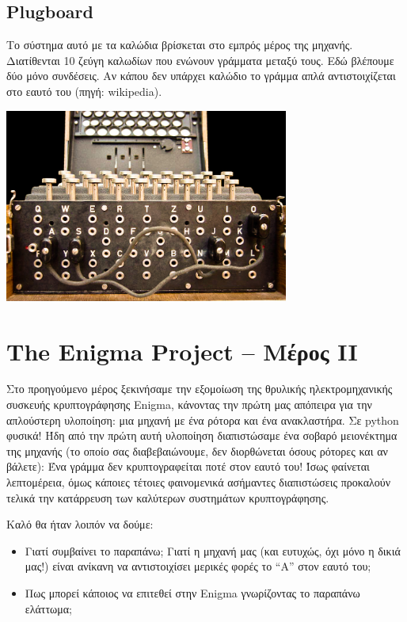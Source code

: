 \documentclass[a4paper,twoside,12pt]{article}
\begin{document}
\subsection{Plugboard}

Το σύστημα αυτό με τα καλώδια βρίσκεται στο εμπρός μέρος της μηχανής. Διατίθενται 10 ζεύγη καλωδίων που ενώνουν γράμματα μεταξύ τους. Εδώ βλέπουμε δύο μόνο συνδέσεις. Αν κάπου δεν υπάρχει καλώδιο το γράμμα απλά αντιστοιχίζεται στο εαυτό του (πηγή: wikipedia).
%
\begin{center}
  \includegraphics[width=0.7\textwidth]{images/main/plugboard}
\end{center}
%
\section{The Enigma Project -- Mέρος II}

Στο προηγούμενο μέρος ξεκινήσαμε την εξομοίωση της θρυλικής ηλεκτρομηχανικής συσκευής κρυπτογράφησης Enigma, κάνοντας την πρώτη μας απόπειρα για την απλούστερη υλοποίηση: μια μηχανή με ένα ρότορα και ένα ανακλαστήρα. Σε python φυσικά! Ήδη από την πρώτη αυτή υλοποίηση διαπιστώσαμε ένα σοβαρό μειονέκτημα της μηχανής (το οποίο σας διαβεβαιώνουμε, δεν διορθώνεται όσους ρότορες και αν βάλετε): Ένα γράμμα δεν κρυπτογραφείται ποτέ στον εαυτό του! Ίσως φαίνεται  λεπτομέρεια, όμως κάποιες τέτοιες φαινομενικά ασήμαντες διαπιστώσεις προκαλούν τελικά την κατάρρευση των καλύτερων συστημάτων κρυπτογράφησης. 

Καλό θα ήταν λοιπόν να δούμε:

\begin{itemize}
\item Γιατί συμβαίνει το παραπάνω; Γιατί η μηχανή μας (και ευτυχώς, όχι μόνο η δικιά μας!) είναι ανίκανη να αντιστοιχίσει μερικές φορές το “Α” στον εαυτό του;
\item Πως μπορεί κάποιος να επιτεθεί στην Enigma γνωρίζοντας το παραπάνω ελάττωμα;
\end{itemize}
\end{document}
